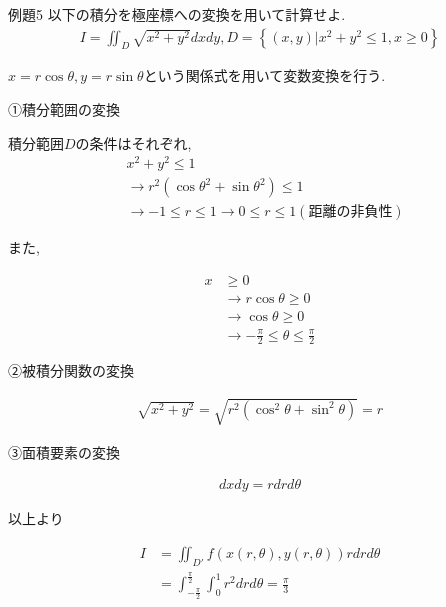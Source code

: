\documentclass[a4paper,12pt]{jlreq}
\begin{document}
\begin{itembox}[l]{例題5}
以下の積分を極座標への変換を用いて計算せよ.
\begin{align*}
    I = \iint_{D}^{} \sqrt{x^2 + y^2} dx dy, D = \left\{(x,y) | x^2 + y^2 \le 1, x \ge 0\right\}
\end{align*}
\end{itembox}

\par
$x = r \cos \theta, y = r \sin \theta$という関係式を用いて変数変換を行う.

\vspace{130pt}

①積分範囲の変換\par

積分範囲$D$の条件はそれぞれ, 
\begin{align*}
    &x^2 + y^2 \le 1\\
    &\rightarrow r^2(\cos \theta^2 + \sin \theta^2) \le 1\\
    &\rightarrow -1 \le r \le 1 \rightarrow 0 \le r \le 1 (\text{距離の非負性})
\end{align*}

また,

\begin{align*}
    x &\ge 0\\
    &\rightarrow r \cos \theta \ge 0\\
    &\rightarrow \cos \theta \ge 0\\
    &\rightarrow -\frac{\pi}{2} \le \theta \le \frac{\pi}{2}
\end{align*}

②被積分関数の変換\par

\begin{align*}
    \sqrt{x^2 + y^2} = \sqrt{r^2(\cos^2 \theta + \sin^2 \theta)} = r
\end{align*}

③面積要素の変換\par

\begin{align*}
    dx dy = rdr d\theta
\end{align*}

以上より

\begin{align*}
    I &= \iint_{D'}^{} f(x(r,\theta),y(r,\theta)) rdrd\theta\\
      &= \int_{-\frac{\pi}{2}}^{\frac{\pi}{2}} \int_{0}^{1} r^2 dr d\theta = \frac{\pi}{3}
\end{align*}
\end{document}
